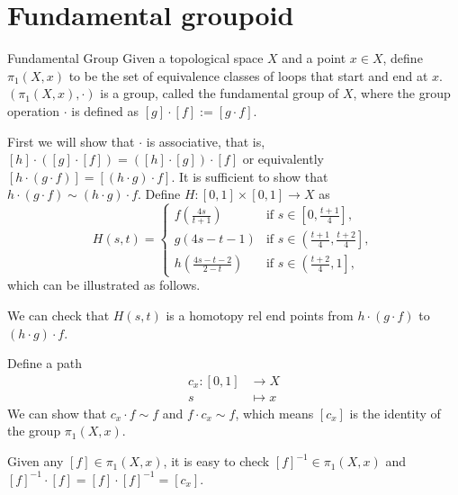 \documentclass{report}
\begin{document}
\section{Fundamental groupoid}
\begin{definition}{Fundamental Group}{}
	Given a topological space $X$ and a point $x\in X$, define $\pi_1(X, x)$ to be the set of equivalence classes of loops that start and end at $x$. $(\pi_1(X, x),\cdot)$ is a group, called the fundamental group of $X$, where the group operation $\cdot$ is defined as $[g]\cdot[f]:=[g\cdot f]$.
\end{definition}

\begin{prf}
	First we will show that $\cdot$ is associative, that is, $[h]\cdot\left([g]\cdot[f]\right)=\left([h]\cdot[g]\right)\cdot[f]$ or equivalently $[h\cdot(g\cdot f)]=[(h\cdot g)\cdot f]$. It is sufficient to show that $h\cdot(g\cdot f)\sim (h\cdot g)\cdot f$. Define $H:[0,1]\times[0,1]\to X$ as
	\[
		H(s,t)=\begin{cases}
			f\left(\frac{4s}{t+1}\right)&\text{if }s\in\left[0,\frac{t+1}{4}\right],\\
			g(4s-t-1)&\text{if }s\in\left(\left.\frac{t+1}{4},\frac{t+2}{4}\right]\right.,\\
			h\left(\frac{4s-t-2}{2-t}\right)&\text{if }s\in\left(\left.\frac{t+2}{4},1\right]\right.,
		\end{cases}
	\]
	which can be illustrated as follows.
	\begin{center}
	\end{center}
	We can check that $H(s,t)$ is a homotopy rel end points from $h\cdot(g\cdot f)$ to $(h\cdot g)\cdot f$.

	Define a path
	\begin{align*}
		c_x:[0,1] &\longrightarrow X\\
		s &\longmapsto x
	\end{align*}
	We can show that $c_x\cdot f\sim f$ and $f\cdot c_x\sim f$, which means $[c_x]$ is the identity of the group $\pi_1(X,x)$. 

	Given any $[f]\in \pi_1(X,x)$, it is easy to check $\left[f\right]^{-1}\in \pi_1(X,x)$ and $[f]^{-1}\cdot[f]=[f]\cdot[f]^{-1}=[c_x]$.
\end{prf}
\end{document}

